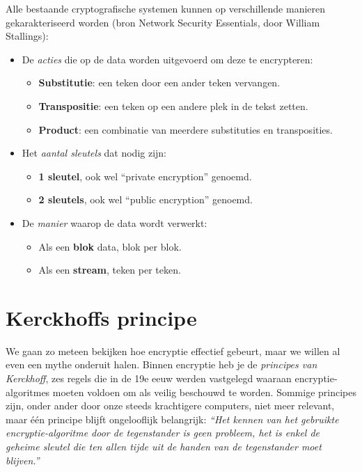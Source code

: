 \documentclass[
  10pt,
  dutch,
  paper=a4,
  ,captions=tableheading
]{scrbook}
\providecommand{\tightlist}{%
  \setlength{\itemsep}{0pt}\setlength{\parskip}{0pt}}
\begin{document}
Alle bestaande cryptografische systemen kunnen op verschillende manieren
gekarakteriseerd worden (bron Network Security Essentials, door William
Stallings):

\begin{itemize}
\tightlist
\item
  De \emph{acties} die op de data worden uitgevoerd om deze te
  encrypteren:

  \begin{itemize}
  \tightlist
  \item
    \textbf{Substitutie}: een teken door een ander teken vervangen.
  \item
    \textbf{Transpositie}: een teken op een andere plek in de tekst
    zetten.
  \item
    \textbf{Product}: een combinatie van meerdere substituties en
    transposities.
  \end{itemize}
\item
  Het \emph{aantal sleutels} dat nodig zijn:

  \begin{itemize}
  \tightlist
  \item
    \textbf{1 sleutel}, ook wel ``private encryption'' genoemd.
  \item
    \textbf{2 sleutels}, ook wel ``public encryption'' genoemd.
  \end{itemize}
\item
  De \emph{manier} waarop de data wordt verwerkt:

  \begin{itemize}
  \tightlist
  \item
    Als een \textbf{blok} data, blok per blok.
  \item
    Als een \textbf{stream}, teken per teken.
  \end{itemize}
\end{itemize}

\section{Kerckhoffs principe}\label{kerckhoffs-principe}

We gaan zo meteen bekijken hoe encryptie effectief gebeurt, maar we
willen al even een mythe onderuit halen. Binnen encryptie heb je de
\emph{principes van Kerckhoff}, zes regels die in de 19e eeuw werden
vastgelegd waaraan encryptie-algoritmes moeten voldoen om als veilig
beschouwd te worden. Sommige principes zijn, onder ander door onze
steeds krachtigere computers, niet meer relevant, maar één principe
blijft ongelooflijk belangrijk: \emph{``Het kennen van het gebruikte
encryptie-algoritme door de tegenstander is geen probleem, het is enkel
de geheime sleutel die ten allen tijde uit de handen van de tegenstander
moet blijven.''}
\end{document}
